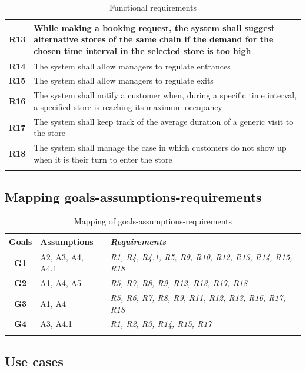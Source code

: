 \documentclass[a4paper,oneside,11pt]{book}   %
\begin{document}
\begin{longtable}[c]{|>{\bfseries{}}c|V{.65\textwidth}|}
        R13  & While making a booking request, the system shall suggest alternative stores of the same chain if the demand for the chosen time interval in the selected store is too high \\ \hline
        R14  & The system shall allow managers to regulate entrances  \\ \hline
        R15  & The system shall allow managers to regulate exits \\ \hline
        R16  & The system shall notify a customer when, during a specific time interval, a specified store is reaching its maximum occupancy \\ \hline
        R17  & The system shall keep track of the average duration of a generic visit to the store \\ \hline
        R18  & The system shall manage the case in which customers do not show up when it is their turn to enter the store \\ \hline
        \caption{Functional requirements}
        \label{table:functional_requirements}
    \end{longtable}
    
    \subsection{Mapping goals-assumptions-requirements}
    \begin{longtable}[c] { |>{\bfseries{}}c|P{0.22\textwidth}|>{\em}V{0.40\textwidth}| }
        \hline
        \textbf{Goals} & \textbf{Assumptions} & \emph{\textbf{Requirements}} \\
        \hline
        G1 & A2, A3, A4, A4.1 & R1, R4, R4.1, R5, R9, R10, R12, R13, R14, R15, R18 \\ \hline
        G2 & A1, A4, A5       & R5, R7, R8, R9, R12, R13, R17, R18 \\ \hline
        G3 & A1, A4           & R5, R6, R7, R8, R9, R11, R12, R13, R16, R17, R18 \\ \hline
        G4 & A3, A4.1         & R1, R2, R3, R14, R15, R17 \\
        \hline
        \caption{Mapping of goals-assumptions-requirements}
        \label{table:map_goals_assumptions_requirements}
    \end{longtable}

    \subsection{Use cases}
\end{document}
